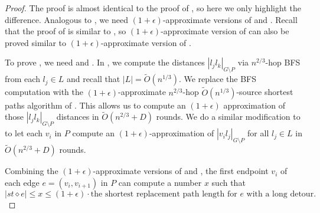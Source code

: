 \begin{proof}
The proof is almost identical to the proof of , so here we only highlight the difference. Analogous to , we need $(1+\epsilon)$-approximate versions of    and . Recall that the proof of  is similar to , so $(1+\epsilon)$-approximate version of  can also be proved similar to  $(1+\epsilon)$-approximate version of .


To prove , we need   and . In , we compute the distances $|l_j l_k|_{G \setminus P}$ via $n^{2/3}$-hop BFS from each $l_j \in L$ and recall that $|L|= \widetilde{O}(n^{1/3})$. We replace the BFS computation with the $(1+\epsilon)$-approximate $n^{2/3}$-hop $\widetilde{O}(n^{1/3})$-source shortest paths algorithm of . This allows us to  compute an $(1+\epsilon)$ approximation of those $|l_j l_k|_{G \setminus P}$ distances in $\widetilde{O}(n^{2/3}+D)$ rounds. We do a similar modification to  to let each $v_i$ in $P$ compute an $(1+\epsilon)$-approximation of $|v_il_j|_{G \setminus P}$ for all $l_j \in L$ in $\widetilde{O}(n^{2/3}+D)$ rounds.




    

    Combining the $(1+\epsilon)$-approximate versions of   and , the first endpoint $v_i$ of each  edge $e=(v_i, v_{i+1})$ in $P$ can compute a number $x$ such that $|st \diamond e| \leq x \leq (1+\epsilon) \cdot \text{the shortest replacement path length for $e$ with a long detour}.$%
\end{proof}


